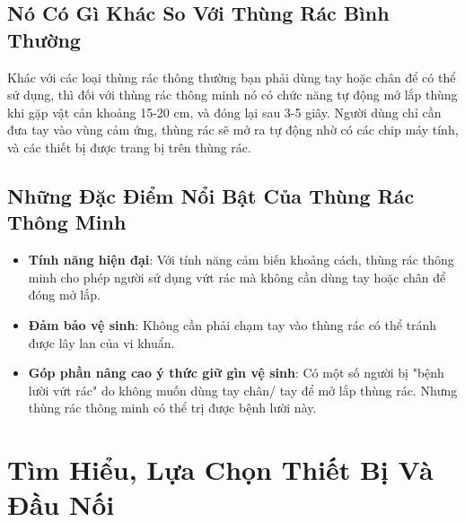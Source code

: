 \documentclass[12pt,a4paper]{article}
\begin{document}
\subsection{Nó Có Gì Khác So Với Thùng Rác Bình Thường}
\hspace{0.7cm}Khác với các loại thùng rác thông thường bạn phải dùng tay hoặc chân để có thể sử dụng, thì đối với thùng rác thông minh nó có chức năng tự động mở lắp thùng khi gặp vật cản khoảng 15-20 cm, và đóng lại sau 3-5 giây. Người dùng chỉ cần đưa tay vào vùng cảm ứng, thùng rác sẽ mở ra tự động nhờ có các chip máy tính, và các thiết bị được trang bị trên thùng rác.
\subsection{Những Đặc Điểm Nổi Bật Của Thùng Rác Thông Minh}
\begin{itemize}
    \item \textbf{Tính năng hiện đại}: Với tính năng cảm biến khoảng cách, thùng rác thông minh cho phép người sử dụng vứt rác mà không cần dùng tay hoặc chân để đóng mở lắp.
    \item \textbf{Đảm bảo vệ sinh}: Không cần phải chạm tay vào thùng rác có thể tránh được lây lan của vi khuẩn.
    \item \textbf{Góp phần nâng cao ý thức giữ gìn vệ sinh}: Có một số người bị "bệnh lười vứt rác" do không muốn dùng tay chân/ tay để mở lắp thùng rác. Nhưng thùng rác thông minh có thể trị được bệnh lười này.
\end{itemize} 
\section{Tìm Hiểu, Lựa Chọn Thiết Bị Và Đầu Nối}
\end{document}
